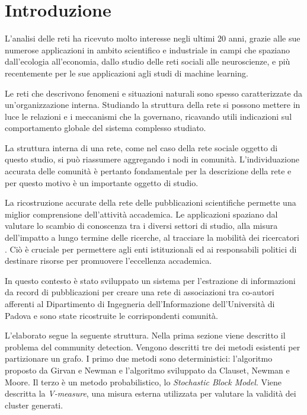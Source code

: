 \documentclass[12pt,a4paper,twoside]{report}
\begin{document}
\section*{Introduzione} \label{introduzione}

L'analisi delle reti ha ricevuto molto interesse negli ultimi 20 anni, grazie alle sue numerose
applicazioni in ambito scientifico e industriale in campi che spaziano dall'ecologia all'economia,
dallo studio delle reti sociali alle neuroscienze, e più recentemente per le sue applicazioni agli
studi di machine learning.

Le reti che descrivono fenomeni e situazioni naturali sono spesso caratterizzate da
un'organizzazione interna. Studiando la struttura della rete si possono mettere
in luce le relazioni e i meccanismi che la governano, ricavando utili indicazioni sul comportamento
globale del sistema complesso studiato.

La struttura interna di una rete, come nel caso della rete sociale oggetto di questo studio, si può
riassumere aggregando i nodi in comunità. L'individuazione accurata delle comunità è pertanto
fondamentale per la descrizione della rete e per questo motivo è un importante oggetto di studio.

La ricostruzione accurate della rete delle pubblicazioni scientifiche permette una miglior
comprensione dell'attività accademica. Le applicazioni spaziano dal valutare lo scambio di
conoscenza tra i diversi settori di studio, alla misura dell'impatto a lungo termine delle ricerche,
al tracciare la mobilità dei ricercatori \cite{Fortunatoeaao0185}. Ciò è cruciale per permettere agli enti
istituzionali ed ai responsabili politici di destinare risorse per promuovere l'eccellenza
accademica.

In questo contesto è stato sviluppato un sistema per l'estrazione di informazioni da record di
pubblicazioni per creare una rete di associazioni tra co-autori afferenti al Dipartimento di
Ingegneria dell'Informazione dell'Università di Padova e sono state ricostruite le corrispondenti
comunità.

L'elaborato segue la seguente struttura.
Nella prima sezione viene descritto il problema del community detection. Vengono descritti tre dei
metodi esistenti per partizionare un grafo. I primo due metodi sono deterministici: l'algoritmo
proposto da Girvan e Newman e l'algoritmo sviluppato da Clauset, Newman e Moore. Il terzo è un
metodo probabilistico, lo \textit{Stochastic Block Model}. Viene descritta la \textit{V-measure},
una misura esterna utilizzata per valutare la validità dei cluster generati.
\end{document}
